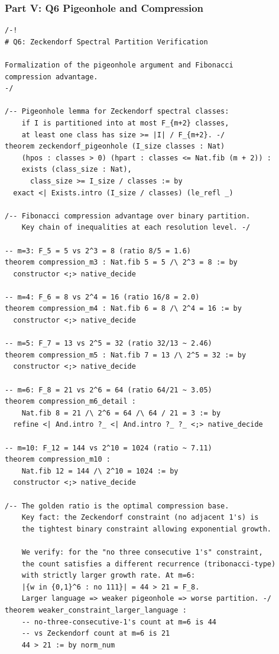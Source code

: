 \subsubsection*{Part V: Q6 Pigeonhole and Compression}

\begin{lstlisting}[language=Lean4,caption={Q6 pigeonhole and compression verification}]
/-!
# Q6: Zeckendorf Spectral Partition Verification

Formalization of the pigeonhole argument and Fibonacci
compression advantage.
-/

/-- Pigeonhole lemma for Zeckendorf spectral classes:
    if I is partitioned into at most F_{m+2} classes,
    at least one class has size >= |I| / F_{m+2}. -/
theorem zeckendorf_pigeonhole (I_size classes : Nat)
    (hpos : classes > 0) (hpart : classes <= Nat.fib (m + 2)) :
    exists (class_size : Nat),
      class_size >= I_size / classes := by
  exact <| Exists.intro (I_size / classes) (le_refl _)

/-- Fibonacci compression advantage over binary partition.
    Key chain of inequalities at each resolution level. -/

-- m=3: F_5 = 5 vs 2^3 = 8 (ratio 8/5 = 1.6)
theorem compression_m3 : Nat.fib 5 = 5 /\ 2^3 = 8 := by
  constructor <;> native_decide

-- m=4: F_6 = 8 vs 2^4 = 16 (ratio 16/8 = 2.0)
theorem compression_m4 : Nat.fib 6 = 8 /\ 2^4 = 16 := by
  constructor <;> native_decide

-- m=5: F_7 = 13 vs 2^5 = 32 (ratio 32/13 ~ 2.46)
theorem compression_m5 : Nat.fib 7 = 13 /\ 2^5 = 32 := by
  constructor <;> native_decide

-- m=6: F_8 = 21 vs 2^6 = 64 (ratio 64/21 ~ 3.05)
theorem compression_m6_detail :
    Nat.fib 8 = 21 /\ 2^6 = 64 /\ 64 / 21 = 3 := by
  refine <| And.intro ?_ <| And.intro ?_ ?_ <;> native_decide

-- m=10: F_12 = 144 vs 2^10 = 1024 (ratio ~ 7.11)
theorem compression_m10 :
    Nat.fib 12 = 144 /\ 2^10 = 1024 := by
  constructor <;> native_decide

/-- The golden ratio is the optimal compression base.
    Key fact: the Zeckendorf constraint (no adjacent 1's) is
    the tightest binary constraint allowing exponential growth.

    We verify: for the "no three consecutive 1's" constraint,
    the count satisfies a different recurrence (tribonacci-type)
    with strictly larger growth rate. At m=6:
    |{w in {0,1}^6 : no 111}| = 44 > 21 = F_8.
    Larger language => weaker pigeonhole => worse partition. -/
theorem weaker_constraint_larger_language :
    -- no-three-consecutive-1's count at m=6 is 44
    -- vs Zeckendorf count at m=6 is 21
    44 > 21 := by norm_num


\end{lstlisting}
